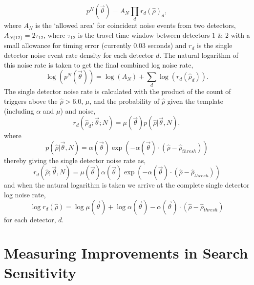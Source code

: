 %
\begin{equation}
    p^{N}(\Vec{\theta}) = A_{N} \prod_{d} r_{d}(\hat{\rho})_{d} ,
\label{5:eqn:comb-noise-rate}
\end{equation}
%
where $A_{N}$ is the `allowed area' for coincident noise events from two detectors, $A_{N\{12\}} = 2\tau_{12}$, where $\tau_{12}$ is the \gwadj travel time window between detectors $1$ \& $2$ with a small allowance for timing error (currently $0.03$ seconds) and $r_{d}$ is the single detector noise event rate density for each detector $d$. The natural logarithm of this noise rate is taken to get the final combined log noise rate,
%
\begin{equation}
    \log(p^{N}(\Vec{\theta})) = \log(A_{N}) +  \sum_{d} \log(r_{d}(\hat{\rho}_{d})) .
\label{5:eqn:comb-log-noise-rate}
\end{equation}
%
The single detector noise rate is calculated with the product of the count of triggers above the $\hat{\rho} > 6.0$, $\mu$, and the probability of $\hat{\rho}$ given the template (including $\alpha$ and $\mu$) and noise,
%
\begin{equation}
    r_{d}(\hat{\rho}_{d}; {\Vec{\theta}}; N) = \mu(\Vec{\theta}) p(\hat{\rho} | \Vec{\theta}, N) ,
\label{5:eqn:single-noise-rate}
\end{equation}
%
where
%
\begin{equation}
    p(\hat{\rho} | \Vec{\theta}, N) = \alpha(\Vec{\theta}) \exp\left(-\alpha(\Vec{\theta})\cdot\left(\hat{\rho} - \hat{\rho}_{thresh}\right)\right)
\label{5:eqn:p-definition}
\end{equation}
%
thereby giving the single detector noise rate as,
%
\begin{equation}
    r_{d}(\hat{\rho}; {\Vec{\theta}}, N) = \mu(\Vec{\theta}) \alpha(\Vec{\theta}) \exp\left(-\alpha(\Vec{\theta}) \cdot (\hat{\rho} - \hat{\rho}_{thresh})\right)
\label{5:eqn:single-noise-rate-full}
\end{equation}
%
and when the natural logarithm is taken we arrive at the complete single detector log noise rate,
%
\begin{equation}
    \log r_{d}(\hat{\rho}) = \log\mu(\Vec{\theta}) +  \log\alpha(\Vec{\theta}) - \alpha(\Vec{\theta}) \cdot(\hat{\rho} - \hat{\rho}_{thresh})
\label{5:eqn:single-log-noise-rate}
\end{equation}
%
for each detector, $d$.

\section{\label{5:sec:injection-tests}Measuring Improvements in Search Sensitivity}

